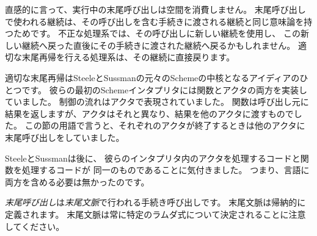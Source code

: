\begin{rationale}

直感的に言って、実行中の末尾呼び出しは空間を消費しません。
末尾呼び出しで使われる継続は、その呼び出しを含む手続きに渡される継続と同じ意味論を持つためです。
不正な処理系では、その呼び出しに新しい継続を使用し、
この新しい継続へ戻った直後にその手続きに渡された継続へ戻るかもしれません。
適切な末尾再帰を行える処理系は、その継続に直接戻ります。

適切な末尾再帰はSteeleとSussmanの元々のSchemeの中核となるアイディアのひとつです。
彼らの最初のSchemeインタプリタには関数とアクタの両方を実装していました。
制御の流れはアクタで表現されていました。
関数は呼び出し元に結果を返しますが、アクタはそれと異なり、結果を他のアクタに渡すものでした。
この節の用語で言うと、それぞれのアクタが終了するときは他のアクタに末尾呼び出しをしていました。

SteeleとSussmanは後に、
彼らのインタプリタ内のアクタを処理するコードと関数を処理するコードが
同一のものであることに気付きました。
つまり、言語に両方を含める必要は無かったのです。

\end{rationale}

{\em 末尾呼び出し}は{\em 末尾文脈}で行われる手続き呼び出しです。
末尾文脈は帰納的に定義されます。
末尾文脈は常に特定のラムダ式について決定されることに注意してください。

